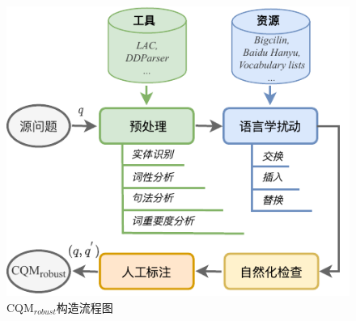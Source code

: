 \begin{figure}[h]
    \centering
      \includegraphics[scale=0.95]{figure/fig5-2.pdf}
    \caption{CQM$_{robust}$构造流程图}
    \label{fig5-2}
\end{figure}